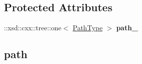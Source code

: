 \subsection*{Protected Attributes}
\begin{DoxyCompactItemize}
\item 
\hypertarget{classopenstack_1_1xml_1_1File_adfde0a9f4742f554f9e72100b163b79d}{
::xsd::cxx::tree::one$<$ \hyperlink{classopenstack_1_1xml_1_1FileName}{PathType} $>$ {\bfseries path\_\-}}
\label{classopenstack_1_1xml_1_1File_adfde0a9f4742f554f9e72100b163b79d}

\end{DoxyCompactItemize}
\subsection*{path}
\label{_amgrpd6fe1d0be6347b8ef2427fa629c04485}
